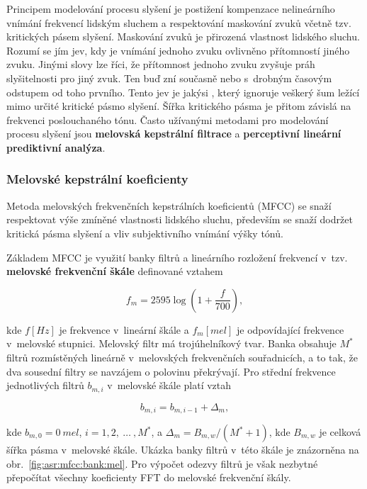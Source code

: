 Principem modelování procesu slyšení je postižení kompenzace nelineárního vnímání frekvencí lidským sluchem a respektování maskování zvuků včetně tzv. kritických pásem slyšení. Maskování zvuků je přirozená vlastnost lidského sluchu. Rozumí se jím jev, kdy je vnímání jednoho zvuku ovlivněno přítomností jiného zvuku. Jinými slovy lze říci, že přítomnost jednoho zvuku zvyšuje práh slyšitelnosti pro jiný zvuk. Ten buď zní současně nebo s~drobným časovým odstupem od toho prvního. Tento jev je jakýsi , který ignoruje veškerý šum ležící mimo určité kritické pásmo slyšení. Šířka kritického pásma je přitom závislá na frekvenci poslouchaného tónu. Často užívanými metodami pro modelování procesu slyšení jsou \textbf{melovská kepstrální filtrace} a \textbf{perceptivní lineární prediktivní analýza}.

\subsubsection{Melovské kepstrální koeficienty}

Metoda melovských frekvenčních kepstrálních koeficientů (MFCC) se snaží respektovat výše zmíněné vlastnosti lidského sluchu, především se snaží dodržet kritická pásma slyšení a vliv subjektivního vnímání výšky tónů.

Základem MFCC je využití banky filtrů a lineárního rozložení frekvencí v~tzv. \textbf{melovské frekvenční škále} definované vztahem

\begin{equation}
  f_m = 2595 \log \left(1 + \frac{f}{700}\right),
  \label{eq:asr:mfcc:melscale}
\end{equation}

\noindent kde $f \left[Hz\right]$ je frekvence v~lineární škále a $f_m \left[mel\right]$ je odpovídající frekvence v~melovské stupnici. Melovský filtr má trojúhelníkový tvar. Banka obsahuje $M^{*}$ filtrů rozmístěných lineárně v~melovských frekvenčních souřadnicích, a to tak, že dva sousední filtry se navzájem o polovinu překrývají. Pro střední frekvence jednotlivých filtrů $b_{m,i}$ v~melovské škále platí vztah

\begin{equation}
  b_{m,i} = b_{m,i-1} + \Delta_{m},
  \label{eq:asr:mfcc:freq}
\end{equation}

\noindent kde $b_{m, 0} = 0\ mel$, $i = 1, 2,\ \dots\ , M^{*}$, a $\Delta_m = B_{m,w} / (M^{*} + 1)$, kde $B_{m,w}$ je celková šířka pásma v~melovské škále. Ukázka banky filtrů v~této škále je znázorněna na obr.~\ref{fig:asr:mfcc:bank:mel}. Pro výpočet odezvy filtrů je však nezbytné přepočítat všechny koeficienty FFT do melovské frekvenční škály.

